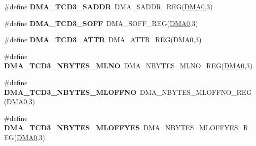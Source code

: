 \begin{DoxyCompactItemize}
\item 
\#define {\bfseries D\+M\+A\+\_\+\+T\+C\+D3\+\_\+\+S\+A\+D\+DR}~D\+M\+A\+\_\+\+S\+A\+D\+D\+R\+\_\+\+R\+EG(\hyperlink{group__DMA__Peripheral__Access__Layer_ga4103044f9ca209772f513dc694513ffb}{D\+M\+A0},3)\hypertarget{group__DMA__Register__Accessor__Macros_gae015b1c8ea3e04489c82a43512f27ab1}{}\label{group__DMA__Register__Accessor__Macros_gae015b1c8ea3e04489c82a43512f27ab1}

\item 
\#define {\bfseries D\+M\+A\+\_\+\+T\+C\+D3\+\_\+\+S\+O\+FF}~D\+M\+A\+\_\+\+S\+O\+F\+F\+\_\+\+R\+EG(\hyperlink{group__DMA__Peripheral__Access__Layer_ga4103044f9ca209772f513dc694513ffb}{D\+M\+A0},3)\hypertarget{group__DMA__Register__Accessor__Macros_ga15058eb1943489c3a2f36308d61fd628}{}\label{group__DMA__Register__Accessor__Macros_ga15058eb1943489c3a2f36308d61fd628}

\item 
\#define {\bfseries D\+M\+A\+\_\+\+T\+C\+D3\+\_\+\+A\+T\+TR}~D\+M\+A\+\_\+\+A\+T\+T\+R\+\_\+\+R\+EG(\hyperlink{group__DMA__Peripheral__Access__Layer_ga4103044f9ca209772f513dc694513ffb}{D\+M\+A0},3)\hypertarget{group__DMA__Register__Accessor__Macros_ga2782d5194fea9642ce17125a8c1b8e67}{}\label{group__DMA__Register__Accessor__Macros_ga2782d5194fea9642ce17125a8c1b8e67}

\item 
\#define {\bfseries D\+M\+A\+\_\+\+T\+C\+D3\+\_\+\+N\+B\+Y\+T\+E\+S\+\_\+\+M\+L\+NO}~D\+M\+A\+\_\+\+N\+B\+Y\+T\+E\+S\+\_\+\+M\+L\+N\+O\+\_\+\+R\+EG(\hyperlink{group__DMA__Peripheral__Access__Layer_ga4103044f9ca209772f513dc694513ffb}{D\+M\+A0},3)\hypertarget{group__DMA__Register__Accessor__Macros_ga19846e750847e4f60b1e73fed4224075}{}\label{group__DMA__Register__Accessor__Macros_ga19846e750847e4f60b1e73fed4224075}

\item 
\#define {\bfseries D\+M\+A\+\_\+\+T\+C\+D3\+\_\+\+N\+B\+Y\+T\+E\+S\+\_\+\+M\+L\+O\+F\+F\+NO}~D\+M\+A\+\_\+\+N\+B\+Y\+T\+E\+S\+\_\+\+M\+L\+O\+F\+F\+N\+O\+\_\+\+R\+EG(\hyperlink{group__DMA__Peripheral__Access__Layer_ga4103044f9ca209772f513dc694513ffb}{D\+M\+A0},3)\hypertarget{group__DMA__Register__Accessor__Macros_ga15bc0c9aad4d4aad6febd15eb31cc834}{}\label{group__DMA__Register__Accessor__Macros_ga15bc0c9aad4d4aad6febd15eb31cc834}

\item 
\#define {\bfseries D\+M\+A\+\_\+\+T\+C\+D3\+\_\+\+N\+B\+Y\+T\+E\+S\+\_\+\+M\+L\+O\+F\+F\+Y\+ES}~D\+M\+A\+\_\+\+N\+B\+Y\+T\+E\+S\+\_\+\+M\+L\+O\+F\+F\+Y\+E\+S\+\_\+\+R\+EG(\hyperlink{group__DMA__Peripheral__Access__Layer_ga4103044f9ca209772f513dc694513ffb}{D\+M\+A0},3)\hypertarget{group__DMA__Register__Accessor__Macros_gab3dd0db34f893d8115cc7bf6f0bd5a07}{}\label{group__DMA__Register__Accessor__Macros_gab3dd0db34f893d8115cc7bf6f0bd5a07}


\end{DoxyCompactItemize}
